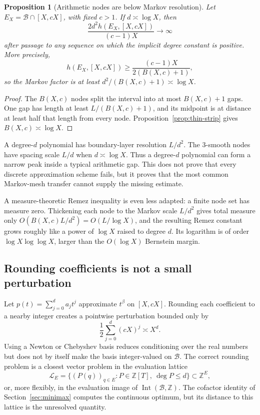 \documentclass[11pt,oneside]{article}
\newtheorem{proposition}[theorem]{Proposition}
\theoremstyle{definition}
\theoremstyle{remark}
\newcommand{\Z}{\mathbb Z}
\newcommand{\Bsem}{\mathcal B}
\newcommand{\Int}{\operatorname{Int}}
\begin{document}
\begin{proposition}[Arithmetic nodes are below Markov resolution]
\label{prop:markov-deficit}
Let $E_X=\Bsem\cap[X,cX]$, with fixed $c>1$.  If $d\asymp\log X$, then
\[
 \frac{2d^2h(E_X,[X,cX])}{(c-1)X}\longrightarrow\infty
\]
after passage to any sequence on which the implicit degree constant is positive.  More
precisely,
\[
 h(E_X,[X,cX])\ge
 \frac{(c-1)X}{2(B(X,c)+1)},
\]
so the Markov factor is at least $d^2/(B(X,c)+1)\asymp\log X$.
\end{proposition}

\begin{proof}
The $B(X,c)$ nodes split the interval into at most $B(X,c)+1$ gaps.  One gap has length at
least $L/(B(X,c)+1)$, and its midpoint is at distance at least half that length from every
node.  Proposition~\ref{prop:thin-strip} gives $B(X,c)\asymp\log X$.
\end{proof}

A degree-$d$ polynomial has boundary-layer resolution $L/d^2$.  The $3$-smooth nodes have
spacing scale $L/d$ when $d\asymp\log X$.  Thus a degree-$d$ polynomial can form a narrow peak
inside a typical arithmetic gap.  This does not prove that every discrete approximation
scheme fails, but it proves that the most common Markov-mesh transfer cannot supply the
missing estimate.

A measure-theoretic Remez inequality is even less adapted: a finite node set has measure zero.
Thickening each node to the Markov scale $L/d^2$ gives total measure only
$O(B(X,c)L/d^2)=O(L/\log X)$, and the resulting Remez constant grows roughly like a power of
$\log X$ raised to degree $d$.  Its logarithm is of order
$\log X\log\log X$, larger than the $O(\log X)$ Bernstein margin.

\subsection{Rounding coefficients is not a small perturbation}

Let $p(t)=\sum_{j=0}^da_jt^j$ approximate $t^\beta$ on $[X,cX]$.  Rounding each coefficient
to a nearby integer creates a pointwise perturbation bounded only by
\[
 \frac12\sum_{j=0}^d(cX)^j\asymp X^d.
\]
Using a Newton or Chebyshev basis reduces conditioning over the real numbers but does not by
itself make the basis integer-valued on $\Bsem$.  The correct rounding problem is a closest
vector problem in the evaluation lattice
\[
 \mathcal L_E=
 \bigl\{(P(q))_{q\in E}:P\in\Z[T],\ \deg P\le d\bigr\}\subset\Z^E,
\]
or, more flexibly, in the evaluation image of $\Int(\Bsem,\Z)$.  The cofactor identity of
Section~\ref{sec:minimax} computes the continuous optimum, but its distance to this lattice is
the unresolved quantity.
\end{document}
